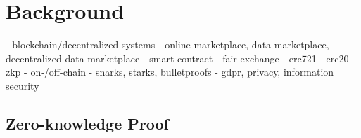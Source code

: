\chapter{Background}
\label{cha:background}

- blockchain/decentralized systems
- online marketplace, data marketplace, decentralized data marketplace
- smart contract
- fair exchange
- erc721
- erc20
- zkp
- on-/off-chain
- snarks, starks, bulletproofs
- gdpr, privacy, information security



\section{Zero-knowledge Proof}
\label{sec:zkp}

